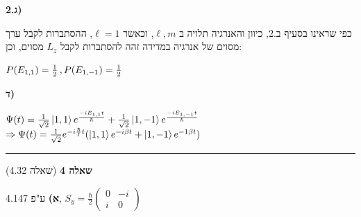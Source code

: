 \documentclass[14pt]{extarticle}
\makeatletter
\newenvironment{lefteqs}{%
    \begin{english}%
    \begin{flushleft}%
    \renewcommand{\arraystretch}{1.3}%
    $\begin{array}{@{}l@{}}%
}{%
    \end{array}$%
    \end{flushleft}%
    \end{english}%
}
\makeatother
\begin{document}
\textbf{ג.2)}

כפי שראינו בסעיף ב.2, כיוון והאנרגיה תלויה ב $\ell, m$, וכאשר $\ell = 1$,
ההסתברות לקבל ערך מסוים של אנרגיה במדידה זהה להסתברות לקבל $L_z$ מסוים, וכן:
\begin{lefteqs}
    P(E_{1,1}) = \frac{1}{2} \, , P(E_{1,-1}) = \frac{1}{2}
\end{lefteqs}

\textbf{ד)}

\begin{lefteqs}
    \Psi(t) = \frac{1}{\sqrt{2}} \ket{1,1} e^{\frac{-i E_{1,1} t}{\hbar}} + \frac{1}{\sqrt{2}} \ket{1,-1} e^{\frac{-i E_{1,-1} t}{\hbar}} \\
    \Rightarrow \Psi(t) = \frac{1}{\sqrt{2}} e^{-i \frac{\hbar}{I} t} (\ket{1,1} e^{-i \beta t} + \ket{1,-1} e^{-1 \beta t})
\end{lefteqs}

\vspace{3em}
\hrule
\vspace{2em}

\textbf{\large שאלה 4}
(שאלה 4.32)

\textbf{א)}
ע"פ 4.147, $S_y = \frac{\hbar}{2} \begin{pmatrix}
    0 & -i \\
    i & 0
\end{pmatrix}$
\end{document}
